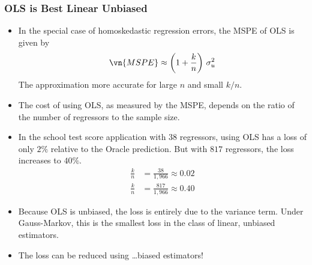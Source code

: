 \begin{frame}
\frametitle{OLS is Best Linear Unbiased}
\begin{itemize}
\item In the special case of homoskedastic regression errors, the MSPE of OLS is given by
\begin{align*}
\vn{MSPE} \approx \left(1+\frac{k}{n}\right)\, \sigma^{2}_{u}
\end{align*}
The approximation more accurate for large $n$ and small $k/n$.
\item The cost of using OLS, as measured by the MSPE, depends on the ratio of the number of regressors to the sample size. 
\item In the school test score application with $38$ regressors, using OLS has a loss of only $2\%$ relative to the Oracle prediction. But with $817$ regressors, the loss increases to $40\%$. 
\begin{align*}
\frac{k}{n} & = \frac{38}{1,966} \approx 0.02\\
\frac{k}{n} & = \frac{817}{1,966} \approx 0.40
\end{align*}
\item Because OLS is unbiased, the loss is entirely due to the variance term. Under Gauss-Markov, this is the smallest loss in the class of linear, unbiased estimators. 
\item The loss can be reduced using \ldots biased estimators!
\end{itemize}
\end{frame}


